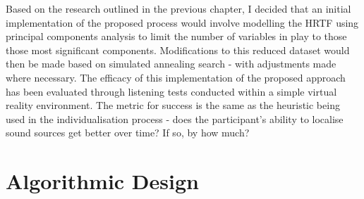Based on the research outlined in the previous chapter, I decided that an initial implementation of the proposed process would involve modelling the HRTF using principal components analysis to limit the number of variables in play to those those most significant components. Modifications to this reduced dataset would then be made based on simulated annealing search - with adjustments made where necessary. The efficacy of this implementation of the proposed approach has been evaluated through listening tests conducted within a simple virtual reality environment. The metric for success is the same as the heuristic being used in the individualisation process - does the participant's ability to localise sound sources get better over time? If so, by how much?

\section{Algorithmic Design}
